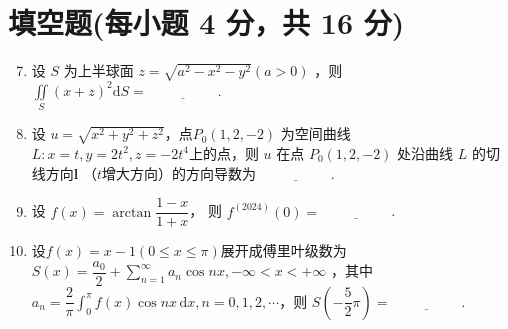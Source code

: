 \documentclass[../Main.tex]{subfiles}
\begin{document}
\section{填空题(每小题 4 分，共 16 分)}
\begin{enumerate}
  \setcounter{enumi}{6}
  \item 设 \( S \) 为上半球面 \( z=\sqrt{a^2-x^2-y^2}(a>0) \) ，则 \( \displaystyle \iint \limits_S \left( x+z \right)^2 \mathrm{d}S = \underline{\hspace{5em}} \).

  \item 设 \( u = \sqrt{x^2 + y^2 + z^2} \)，点\( P_0(1, 2, -2) \) 为空间曲线 \( L: x = t, y = 2t^2, z = -2t^4 \)上的点，则 \( u \) 在点 \( P_0(1,2,-2) \) 处沿曲线 \( L \) 的切线方向\( \boldsymbol{l} \) （$t$增大方向）的方向导数为  \(\underline{\hspace{5em}}\).

  \item 设 \( f(x)=\arctan{\dfrac{1-x}{1+x}} \)， 则 \( f^{(2024)}(0)= \underline{\hspace{5em}} \).

  \item 设$f(x)=x-1(0 \leq x \leq \pi)$展开成傅里叶级数为 \(S(x)=\dfrac{a_0}{2}+ \displaystyle \sum \limits_{n=1}^{\infty} a_n \cos{nx},-\infty<x<+\infty \) ，其中$a_n=\dfrac{2}{\pi}\displaystyle \int_0^{\pi} f(x)\cos{nx}\,\mathrm{d}x,n=0,1,2,\cdots$，则 \(S\left(-\dfrac{5}{2}\pi\right)=\underline{\hspace{5em}}\).
\end{enumerate}
\end{document}
